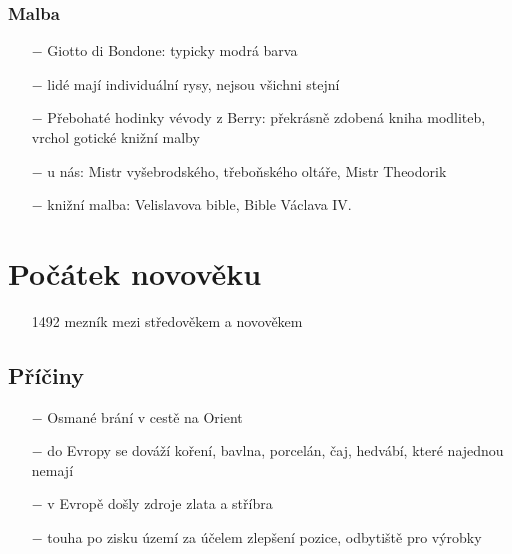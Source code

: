 \documentclass{article}
\begin{document}
\subsubsection*{Malba}
\begin{itemize}
    \vspace{-0.5em}
    \setlength\itemsep{0.15em}
    \item[$-$] Giotto di Bondone: typicky modrá barva
    \item[$-$] lidé mají individuální rysy, nejsou všichni stejní
    \item[$-$] Přebohaté hodinky vévody z Berry: překrásně zdobená kniha modliteb, vrchol gotické knižní malby
    \item[$-$] u nás: Mistr vyšebrodského, třeboňského oltáře, Mistr Theodorik
    \item[$-$] knižní malba: Velislavova bible, Bible Václava IV.
\end{itemize}


\section*{Počátek novověku}
\begin{itemize}
    \vspace{-0.5em}
    \setlength\itemsep{0.15em}
    \item[1492] mezník mezi středověkem a novověkem
\end{itemize}

\subsection*{Příčiny}
\begin{itemize}
    \vspace{-0.5em}
    \setlength\itemsep{0.15em}
    \item[$-$] Osmané brání v cestě na Orient
    \item[$-$] do Evropy se dováží koření, bavlna, porcelán, čaj, hedvábí, které najednou nemají
    \item[$-$] v Evropě došly zdroje zlata a stříbra
    \item[$-$] touha po zisku území za účelem zlepšení pozice, odbytiště pro výrobky
\end{itemize}
\end{document}
